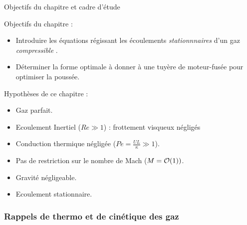 \begin{frame}{Objectifs du chapitre et cadre d'étude}




\small

Objectifs du chapitre : 
\begin{itemize}
\item Introduire les équations régissant les écoulements {\em stationnnaires}  d'un gaz {\em compressible }.
\item Déterminer la forme optimale à donner à une tuyère de moteur-fusée pour optimiser la poussée.
\end{itemize}


\bigskip

\pause

Hypothèses de ce chapitre :  
\begin{itemize}
\item<1> Gaz parfait.
\item Ecoulement Inertiel ($Re \gg 1$) : frottement visqueux négligés 
\item Conduction thermique négligée ($Pe = \frac{U L}{\kappa} \gg 1$).
\item Pas de restriction sur le nombre de Mach ($M = {\cal O}(1) ) $.
\item Gravité négligeable.
\item Ecoulement stationnaire.  
\end{itemize}

\pause

\end{frame}

\subsubsection{Rappels de thermo et de cinétique des gaz}

